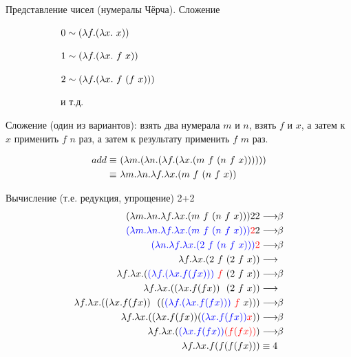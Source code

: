 \begin{frame}{Представление чисел (нумералы Чёрча). Сложение}
\begin{figure}[t]
    \begin{subfigure}[t]{0.45\textwidth}
$ 0 \sim (\lambda f . (\lambda x . \ x))$

$ 1 \sim \lam{f}{\lam{x}{\ f\ x}}$

$ 2 \sim \lam{f}{\lam{x}{\ f\ (f\ x)}}$

  и т.д.
    \end{subfigure}
    \begin{subfigure}[t]{0.45\textwidth}
    \begin{minipage}{\textwidth}
    \numeralIsFor
    \end{minipage}
    \end{subfigure}
\end{figure}

  \vspace{1cm}

  Сложение (один из вариантов): взять два нумерала $m$ и $n$, взять $f$ и $x$, а затем к $x$ применить $f$ $n$ раз, а затем к результату применить $f$ $m$ раз.

\begin{align*}
add \equiv &\ \lam{m}{\lam{n}{\lam{f}{\lam{x}{\app{m\ f\ }{\app{n\ f\ }{x}}}}}}\\
\equiv &\ \lambda m. \lambda n. \lambda f. \lambda x. \app{m\ f\ }{\app{n\ f\ }{x}}
\end{align*}
\end{frame}


\begin{frame}{Вычисление (т.е. редукция, упрощение) 2+2}
\def\betaarr{\longrightarrow\!\!\beta}
\vspace{-2em}
  \begin{align}
    (\lambda m. \lambda n. \lambda f. \lambda x. \app{m\ f\ }{\app{n\ f\ }{x}}){} 2 2 & \betaarr \\
    \textcolor{blue}{(\lambda m. \lambda n. \lambda f. \lambda x. \app{m\ f\ }{\app{n\ f\ }{x}}) {}} \textcolor{red}{2} 2 & \betaarr \\
    \textcolor{blue}{( \lambda n. \lambda f. \lambda x. \app{2\ f\ }{\app{n\ f\ }{x}}){}} \textcolor{red}{2} & \betaarr \\
    \lambda f. \lambda x. \app{2\ f\ }{\app{2\ f\ }{x}}   & \longrightarrow \\
    \lambda f. \lambda x. \app{\tb{\lam{f}{\lam{x}{f (f x)}}} \ \tr{f}\ }{\app{2\ f\ }{x}} & \betaarr \\
    \lambda f. \lambda x. \app{\lam{x}{f (f x)} \ \ }{\app{2\ f\ }{x}} & \longrightarrow \\
    \lambda f. \lambda x. \app{\lam{x}{f (f x)} \ \ } {\app{\app{\tb{\lam{f}{\lam{x}{f (f x)}}}\ \tr{f}\ }{x}}} & \betaarr \\
    \lambda f. \lambda x. \app{\lam{x}{f (f x)}  } {\app{\tb{\lam{x}{f (f x)} } }{\tr{x}}} & \betaarr \\
    \lambda f. \lambda x. \app{\tb{\lam{x}{f (f x)} } } {\tr{(f (f x))}} & \betaarr \\
    \lambda f. \lambda x. f (f (f (f x))) & \equiv 4
  \end{align}
\end{frame}

